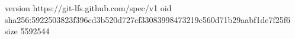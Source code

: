 version https://git-lfs.github.com/spec/v1
oid sha256:5922503823f396cd3b520d727cf33083998473219c560d71b29aabf1de7f25f6
size 5592544
